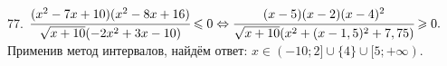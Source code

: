 77. $\cfrac{(x^2-7x+10)(x^2-8x+16)}{\sqrt{x+10}(-2x^2+3x-10)}\leqslant 0\Leftrightarrow \cfrac{(x-5)(x-2)(x-4)^2}{\sqrt{x+10}(x^2+(x-1,5)^2+7,75)}\geqslant 0.$
Применив метод интервалов, найдём ответ: $x\in(-10;2]\cup\{4\}\cup[5;+\infty).$
\begin{figure}[ht!]
\end{figure}\\
